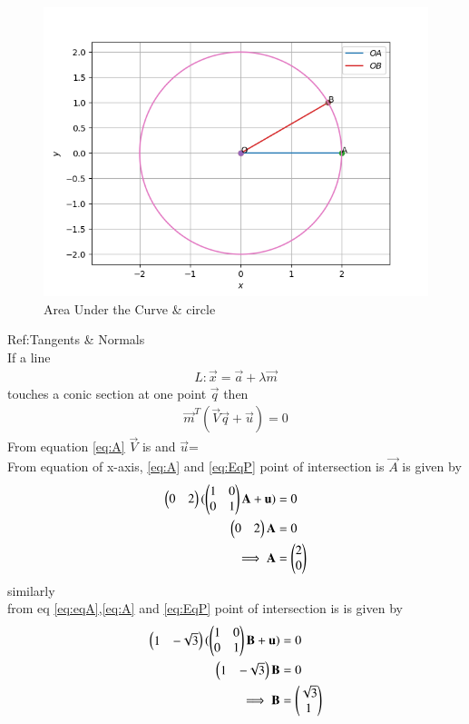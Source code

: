 \documentclass[journal,12pt,twocolumn]{IEEEtran}
\begin{document}
\begin{figure}[H]
\centering
\includegraphics[width=\columnwidth]{circle.png}
\caption{Area Under the Curve & circle  }
\label{fig:1}
\end{figure}
Ref:Tangents & Normals \\
If a line 
\begin{align}
    L:  \vec{x} = \vec{a} + \lambda \vec{m} 
\end{align}
touches a conic section at one point $\vec{q}$ then
\begin{align}
\vec{m}^T(\vec{V} \vec{q}+\vec{u}) = 0  \label{eq:EqP}
\end{align}
From equation \eqref{eq:A} $\Vec{V}$ is   and $\vec{u}$=\\
From equation of x-axis, \eqref{eq:A} and \eqref{eq:EqP} point of intersection is $\Vec{A}$ is given by
\begin{align}
    \begin{pmatrix}0 & 2\end{pmatrix} (\begin{pmatrix}1&0\\0&1\end{pmatrix}\mathbf{A}+\mathbf{u})&=0 \\
    \begin{pmatrix}0&2\end{pmatrix}\mathbf{A}&=0 \\
    \implies \mathbf{A}&=\begin{pmatrix}2\\ 0\end{pmatrix} 
\end{align}
similarly \\
from eq \eqref{eq:eqA},\eqref{eq:A} and \eqref{eq:EqP} point of intersection is  is given by
\begin{align}
    \begin{pmatrix}1 & -\sqrt{3}\end{pmatrix} (\begin{pmatrix}1&0\\0&1\end{pmatrix}\mathbf{B}+\mathbf{u})&=0 \\
    \begin{pmatrix}1 & -\sqrt{3}\end{pmatrix}\mathbf{B}&=0 \\
    \implies \mathbf{B}&=\begin{pmatrix}\sqrt{3} \\ 1 \end{pmatrix} 
\end{align}
\end{document}
